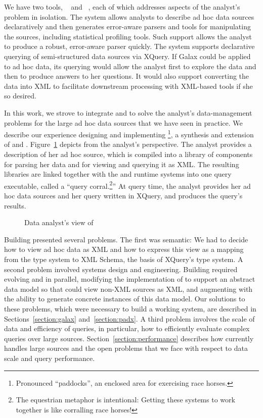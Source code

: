 We have two tools, \pads{}~\cite{pldi05,padsmanual} and
\Galax{}~\cite{galax,galaxmanual}, each of which addresses aspects of
the analyst's problem in isolation.  The \pads{} system allows
analysts to describe ad hoc data sources declaratively and then
generates error-aware parsers and tools for manipulating the sources,
including statistical profiling tools.  Such support allows the
analyst to produce a robust, error-aware parser quickly.  The \Galax{}
system supports declarative querying of semi-structured data sources
via XQuery.  If Galax could be applied to ad hoc data, its querying
would allow the analyst first to explore the data and then to produce
answers to her questions.  It would also support converting the data
into XML to facilitate downstream processing with XML-based tools if
she so desired.

In this work, we strove to integrate \pads{} and \Galax{}
to solve the analyst's data-management problems for the large ad hoc
data sources that we have seen in practice.
We describe our experience designing and implementing
\padx{}\footnote{%
  Pronounced ``paddocks'', an enclosed area for exercising race
  horses.},
a synthesis and extension of \pads{} and 
\Galax{}.  Figure~\ref{figure:padx-arch1} depicts \padx{} from the
analyst's perspective.  The analyst provides a \pads{} description of
her ad hoc source, which is compiled into a library of components for
parsing her data and for viewing and querying it as XML.  The
resulting libraries are linked together with the \pads{} and \Galax{}
runtime systems into one \padx{} query executable, called a ``query
corral.\footnote{%
   The equestrian metaphor is intentional: Getting these systems to
   work together is like corralling race horses!}''
At query time, the analyst provides her ad hoc data sources and her query
written in XQuery, and \padx{} produces the query's results.
\begin{figure}
\begin{center}
\end{center}
\caption{Data analyst's view of \padx{}}
\label{figure:padx-arch1}
\end{figure}

Building \padx{} presented several problems. The first was semantic:
We had to decide how to view ad hoc data as XML and how to express
this view as a mapping from the \pads{} type system to XML Schema, the
basis of XQuery's type system.  A second problem involved systems
design and engineering.  Building \padx{} required evolving \pads{}
and \Galax{} in parallel, modifying the implementation of \Galax{} to
support an abstract data model so that \Galax{} could view non-XML
sources as XML, and augmenting \pads{} with the ability to generate
concrete instances of this data model.  Our solutions to these
problems, which were necessary to build a working system, are
described in Sections~\ref{section:galax} and~\ref{section:padx}.  A
third problem involves the scale of data and efficiency of queries, in
particular, how to efficiently evaluate complex queries over large
sources.  Section~\ref{section:performance} describes how \padx{}
currently handles large sources and the open problems that we face
with respect to data scale and query performance.


